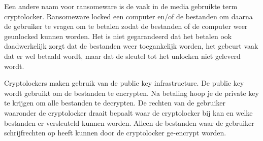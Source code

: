 Een andere naam voor ransomeware is de vaak in de media gebruikte term cryptolocker. Ransomeware locked een computer en/of de bestanden om daarna de gebruiker te vragen om te betalen zodat de bestanden of de computer weer geunlocked kunnen worden. Het is niet gegarandeerd dat het betalen ook daadwerkelijk zorgt dat de bestanden weer toegankelijk worden, het gebeurt vaak dat er wel betaald wordt, maar dat de sleutel tot het unlocken niet geleverd wordt.

Cryptolockers maken gebruik van de public key infrastructure. De public key wordt gebruikt om de bestanden te encrypten. Na betaling hoop je de private key te krijgen om alle bestanden te decrypten. De rechten van de gebruiker waaronder de cryptolocker draait bepaalt waar de cryptolocker bij kan en welke bestanden er versleuteld kunnen worden. Alleen de bestanden waar de gebruiker schrijfrechten op heeft kunnen door de cryptolocker ge-encrypt worden.


